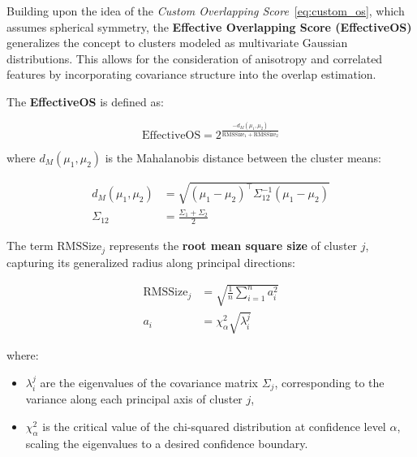 Building upon the idea of the \textit{Custom Overlapping
      Score}~\ref{eq:custom_os}, which assumes spherical symmetry, the
\textbf{Effective Overlapping Score (EffectiveOS)} generalizes the concept to
clusters modeled as multivariate Gaussian distributions. This allows for the
consideration of anisotropy and correlated features by incorporating covariance
structure into the overlap estimation.

The \textbf{EffectiveOS} is defined as:

\begin{equation}
      \text{EffectiveOS} = 2^{\frac{-d_M(\mu_1, \mu_2)}{\text{RMSSize}_1 + \text{RMSSize}_2}}
\end{equation}

where $ d_M(\mu_1, \mu_2) $ is the Mahalanobis distance between the cluster
means:

\begin{align}
      d_M(\mu_1, \mu_2) & = \sqrt{(\mu_1 - \mu_2)^\top \Sigma_{12}^{-1} (\mu_1 - \mu_2)} \\
      \Sigma_{12}       & = \frac{\Sigma_1 + \Sigma_2}{2}
\end{align}

The term $ \text{RMSSize}_j $ represents the \textbf{root mean square size} of
cluster $ j $, capturing its generalized radius along principal directions:

\begin{align}
      \text{RMSSize}_j & = \sqrt{\frac{1}{n} \sum_{i=1}^n a_i^2} \\
      a_i              & = \chi^2_\alpha \sqrt{\lambda_i^j}
\end{align}

where:
\begin{itemize}
      \item $ \lambda_i^j $ are the eigenvalues of the covariance matrix $ \Sigma_j $,
            corresponding to the variance along each principal axis of cluster $ j $,
      \item $ \chi^2_\alpha $ is the critical value of the chi-squared distribution at
            confidence level $ \alpha $, scaling the eigenvalues to a desired confidence boundary.
\end{itemize}

